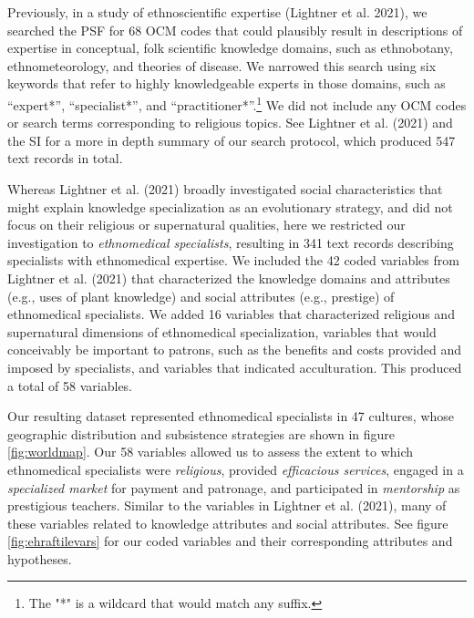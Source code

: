 \documentclass[
  11pt,
]{article}
\begin{document}
Previously, in a study of ethnoscientific expertise (Lightner et al. 2021), we searched the PSF for 68 OCM codes that could plausibly result in descriptions of expertise in conceptual, folk scientific knowledge domains, such as ethnobotany, ethnometeorology, and theories of disease. We narrowed this search using six keywords that refer to highly knowledgeable experts in those domains, such as ``expert*'', ``specialist*'', and ``practitioner*''.\footnote{The "*" is a wildcard that would match any suffix.} We did not include any OCM codes or search terms corresponding to religious topics. See Lightner et al. (2021) and the SI for a more in depth summary of our search protocol, which produced 547 text records in total.

Whereas Lightner et al. (2021) broadly investigated social characteristics that might explain knowledge specialization as an evolutionary strategy, and did not focus on their religious or supernatural qualities, here we restricted our investigation to \emph{ethnomedical specialists}, resulting in 341 text records describing specialists with ethnomedical expertise. We included the 42 coded variables from Lightner et al. (2021) that characterized the knowledge domains and attributes (e.g., uses of plant knowledge) and social attributes (e.g., prestige) of ethnomedical specialists. We added 16 variables that characterized religious and supernatural dimensions of ethnomedical specialization, variables that would conceivably be important to patrons, such as the benefits and costs provided and imposed by specialists, and variables that indicated acculturation. This produced a total of 58 variables.

Our resulting dataset represented ethnomedical specialists in 47 cultures, whose geographic distribution and subsistence strategies are shown in figure \ref{fig:worldmap}. Our 58 variables allowed us to assess the extent to which ethnomedical specialists were \emph{religious}, provided \emph{efficacious services}, engaged in a \emph{specialized market} for payment and patronage, and participated in \emph{mentorship} as prestigious teachers. Similar to the variables in Lightner et al. (2021), many of these variables related to knowledge attributes and social attributes. See figure \ref{fig:ehraftilevars} for our coded variables and their corresponding attributes and hypotheses.
\end{document}
